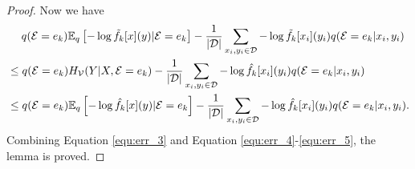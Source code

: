 \begin{proof}
Now we have
\begin{align}
    \label{equ:err_4}
    &\quad\; q(\mathcal E=e_k)\mathbb E_{q} \left[ -\log \Tilde{f_k}[x](y)|\mathcal E=e_k \right]  - \frac{1}{|\mathcal D|} \sum_{x_i,y_i \in \mathcal D} -\log \Tilde{f_k}[x_i](y_i) q(\mathcal E=e_k|x_i,y_i) \\
    &\leq q(\mathcal E=e_k)H_{\mathcal V}(Y|X,\mathcal E=e_k)  - \frac{1}{|\mathcal D|} \sum_{x_i,y_i \in \mathcal D} -\log \hat{f_k}[x_i](y_i) q(\mathcal E=e_k|x_i,y_i) \\
    \label{equ:err_5}
    &\leq q(\mathcal E=e_k)\mathbb E_{q} \left[ -\log \hat{f_k}[x](y)|\mathcal E=e_k \right]  - \frac{1}{|\mathcal D|} \sum_{x_i,y_i \in \mathcal D} -\log \hat{f_k}[x_i](y_i) q(\mathcal E=e_k|x_i,y_i).
\end{align}
Combining Equation \ref{equ:err_3} and Equation \ref{equ:err_4}-\ref{equ:err_5}, the lemma is proved.
\end{proof}

